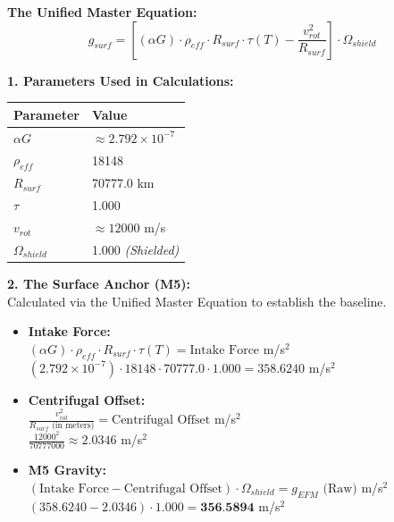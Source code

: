 \documentclass[11pt, a4paper]{article}
\begin{document}
  \vspace{0.5em}
  \noindent \textbf{The Unified Master Equation:}
  $$ g_{surf} = \left[ (\alpha G) \cdot \rho_{eff} \cdot R_{surf} \cdot \tau(T) - \frac{v_{rot}^2}{R_{surf}} \right] \cdot \Omega_{shield} $$

  \vspace{0.5em}
  \noindent \textbf{1. Parameters Used in Calculations:} \\[0.5em]
  \begingroup
  \renewcommand{\arraystretch}{1.3}
  \hspace*{2em}
  \begin{tabular}{|l|l|}
    \hline
    \textbf{Parameter} & \textbf{Value} \\ \hline
    $\alpha G$ & $\approx 2.792 \times 10^{-7}$ \\ \hline
    $\rho_{eff}$ & 18148 \\ \hline
    $R_{surf}$ & 70777.0 km \\ \hline
    $\tau$ & 1.000 \\ \hline
    $v_{rot}$ & $\approx 12000$ m/s \\ \hline
    $\Omega_{shield}$ & 1.000 \textit{(Shielded)} \\ \hline
  \end{tabular}
  \endgroup

  \vspace{1.0em}
  \noindent \textbf{2. The Surface Anchor (M5):} \\
  \hspace*{1em} Calculated via the Unified Master Equation to establish the baseline.
  \begin{itemize}
    \item \textbf{Intake Force:} \\[0.5em]
    \hspace*{2em} $(\alpha G) \cdot \rho_{eff} \cdot R_{surf} \cdot \tau(T) = \text{Intake Force}$ m/s$^2$ \\[1em]
    \hspace*{2em} $(2.792 \times 10^{-7}) \cdot 18148 \cdot 70777.0 \cdot 1.000 = 358.6240$ m/s$^2$
    
    \item \textbf{Centrifugal Offset:} \\[0.5em]
    \hspace*{2em} $\frac{v_{rot}^2}{R_{surf} \text{ (in meters)}} = \text{Centrifugal Offset}$ m/s$^2$ \\[1em]
    \hspace*{2em} $\frac{12000^2}{70777000} \approx 2.0346$ m/s$^2$
    
    \item \textbf{M5 Gravity:} \\[0.5em]
    \hspace*{2em} $(\text{Intake Force} - \text{Centrifugal Offset}) \cdot \Omega_{shield} = g_{EFM} \text{ (Raw)}$ m/s$^2$ \\[1em]
    \hspace*{2em} $(358.6240 - 2.0346) \cdot 1.000 = \textbf{356.5894}$ m/s$^2$
  \end{itemize}
\end{document}
